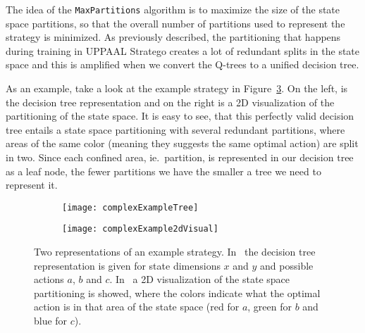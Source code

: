 The idea of the \texttt{MaxPartitions} algorithm is to maximize the size of the
state space partitions, so that the overall number of partitions used to
represent the strategy is minimized. As previously described, the partitioning
that happens during training in UPPAAL Stratego creates a lot of redundant
splits in the state space and this is amplified when we convert the Q-trees to a
unified decision tree.

As an example, take a look at the example strategy in
Figure~\ref{fig:complexExample}. On the left, is the decision tree
representation and on the right is a 2D visualization of the partitioning of the
state space. It is easy to see, that this perfectly valid decision tree entails
a state space partitioning with several redundant partitions, where areas of the
same color (meaning they suggests the same optimal action) are split in two.
Since each confined area, ie.\ partition, is represented in our decision tree as
a leaf node, the fewer partitions we have the smaller a tree we need to
represent it.

\begin{figure}[ht]
    \begin{subfigure}[b]{.5\textwidth}
        \centering
        \texttt{[image: complexExampleTree]}
        \subcaption{%
        }\label{fig:complexExampleTree}
    \end{subfigure}
    \begin{subfigure}[b]{.5\textwidth}
        \centering
        \texttt{[image: complexExample2dVisual]}
        \subcaption{%
        }\label{fig:complexExample2dVisual}
    \end{subfigure}%

    \caption{%
        Two representations of an example strategy.
        In~ the decision tree representation is
        given for state dimensions $x$ and $y$ and possible actions $a$, $b$ and
        $c$. In~ a 2D visualization of the
        state space partitioning is showed, where the colors indicate what the
        optimal action is in that area of the state space (red for $a$, green
        for $b$ and blue for $c$).
    }%
    \label{fig:complexExample}
\end{figure}

